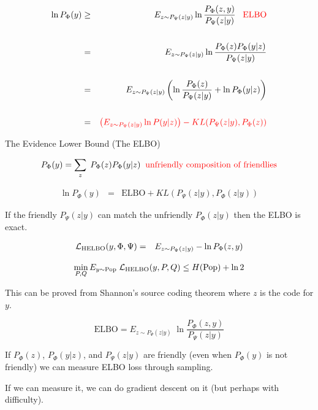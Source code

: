 {\huge
\begin{eqnarray*}
        \ln P_\Phi(y) & \geq & E_{z \sim P_\Psi(z|y)} \ln \frac{P_\Phi(z,y)}{P_\Psi(z|y)}\;\;\;\mbox{\color{red} ELBO} \\
        \\
        & = & E_{z \sim P_\Psi(z|y)} \ln \frac{P_\Phi(z)P_\Phi(y|z)}{P_\Psi(z|y)} \\
        \\
        & = & E_{z \sim P_\Psi(z|y)} \left(\ln \frac{P_\Phi(z)}{P_\Psi(z|y)} +\ln P_\Phi(y|z)\right) \\
        \\
        & = & {\color{red} \left(E_{z \sim P_\Psi(z|y)} \ln P(y|z)\right) - KL(P_\Psi(z|y),P_\Phi(z))}
\end{eqnarray*}
}

{The Evidence Lower Bound (The ELBO)}

$$P_\Phi(y) = \sum_z\;P_\Phi(z)P_\Phi(y|z)\;\;\mbox{\color{red} unfriendly composition of friendlies}$$

\begin{eqnarray*}
\ln P_\Phi(y) & = & \mathrm{ELBO} + KL(P_\Psi(z|y),P_\Phi(z|y))
\end{eqnarray*}


\vfill
{\color{red} If the friendly $P_\Psi(z|y)$ can match the unfriendly $P_\Phi(z|y)$ then the ELBO is exact.}



\begin{eqnarray*}
{\cal L}_{\mathrm{HELBO}}(y,\Phi,\Psi) &  = &  E_{z \sim P_\Psi(z|y)} - \ln P_\Phi(z,y)
\end{eqnarray*}


\vfill
{\color{red} $$\min_{P,Q} E_{y \sim \mathrm{Pop}}\;{\cal L}_{\mathrm{HELBO}}(y,P,Q) \leq H(\mathrm{Pop}) + \ln 2$$}

\vfill
This can be proved from Shannon's source coding theorem where $z$ is the code for $y$.



$$\mathrm{ELBO}  =  E_{z \sim P_\Psi(z|y)}\; \ln \frac{P_\Phi(z,y)}{P_\Psi(z|y)}$$

\vfill
If $P_\Phi(z)$, $P_\Phi(y|z)$, and $P_\Psi(z|y)$ are friendly (even when $P_\Phi(y)$ is not friendly) we can
measure ELBO loss through sampling.

\vfill
If we can measure it, we can do gradient descent on it (but perhaps with difficulty).


